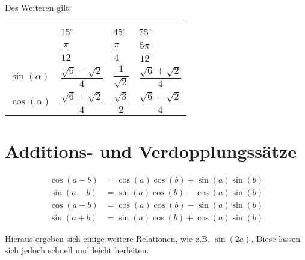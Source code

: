 \\
Des Weiteren gilt:\\
\begin{center}
  \begin{tabu} to 0.9\textwidth{| X[c] | X[c] | X[c] | X[c] |}
    \hline
    & 15$^\circ$ & 45$^\circ$ & 75$^\circ$\\
    & $\dfrac{\pi}{12}$ & $\dfrac{\pi}{4}$ & $\dfrac{5\pi}{12}$\\
    \hline
    $\sin(\alpha)$ & $\dfrac{\sqrt{6}-\sqrt{2}}{4}$ & $\dfrac{1}{\sqrt{2}}$ & $\dfrac{\sqrt{6}+\sqrt{2}}{4}$\\
    \hline
    $\cos(\alpha)$ & $\dfrac{\sqrt{6}+\sqrt{2}}{4}$ & $\dfrac{\sqrt{3}}{2}$ & $\dfrac{\sqrt{6}-\sqrt{2}}{4}$\\
    \hline
  \end{tabu}
\end{center}

\section{Additions- und Verdopplungssätze}
\begin{Theorem}
  \begin{align*}
    \cos(a - b) & = \cos(a)\cos(b) + \sin(a)\sin(b)\\
    \sin(a - b) & = \sin(a)\cos(b) - \cos(a)\sin(b)\\
    \cos(a + b) & = \cos(a)\cos(b) - \sin(a)\sin(b)\\
    \sin(a + b) & = \sin(a)\cos(b) + \cos(a)\sin(b)
  \end{align*}
\end{Theorem}
\begin{Bemerkung}
  Hieraus ergeben sich einige weitere Relationen, wie z.B. $\sin(2a)$. Diese lassen sich jedoch schnell und leicht herleiten.
\end{Bemerkung}
